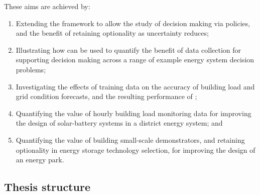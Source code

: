 \newcommand{\aimlabel}[2]{\small \raisebox{.25ex}{\parbox{1.5cm}{\raggedleft \textit{Chap.\! \ref{chap:#1}}\\{\color{gray!75!black}Aim \textbf{#2}}}}\hspace{.75ex}}
\noindent These aims are achieved by:
\begin{enumerate}[] %
    \item[\aimlabel{methodology}{1}] \parbox{\linewidth}{Extending the  framework to allow the study of decision making via policies, and the benefit of retaining optionality as uncertainty reduces;}
    \item[\aimlabel{demonstrations}{1}] \parbox{\linewidth}{Illustrating how  can be used to quantify the benefit of data collection for supporting decision making across a range of example energy system decision problems;}
    \item[\aimlabel{forecasting}{2}] \parbox{\linewidth}{Investigating the effects of training data on the accuracy of building load and grid condition forecasts, and the resulting performance of ;}
    \item[\aimlabel{districts}{3}] \parbox{\linewidth}{Quantifying the value of hourly building load monitoring data for improving the design of solar-battery systems in a district energy system; and}
    \item[\aimlabel{parks}{3}] \parbox{\linewidth}{Quantifying the value of building small-scale demonstrators, and retaining optionality in energy storage technology selection, for improving the design of an energy park.}
\end{enumerate}


\newpage
\subsection{Thesis structure}


